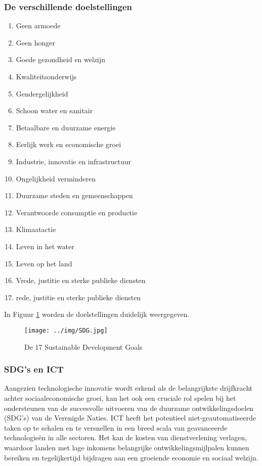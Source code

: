  \subsubsection{De verschillende doelstellingen}
 \begin{enumerate}
 	\item Geen armoede
 		\item Geen honger
 		\item Goede gezondheid en welzijn
 		\item Kwaliteitsonderwijs
 		\item Gendergelijkheid
 		\item Schoon water en sanitair
 		\item Betaalbare en duurzame energie
 		\item Eerlijk werk en economische groei
 		\item Industrie, innovatie en infrastructuur
 		\item Ongelijkheid verminderen
 		\item Duurzame steden en gemeenschappen
 		\item Verantwoorde consumptie en productie
 		\item Klimaatactie
 		\item Leven in het water
 		\item Leven op het land
 		\item Vrede, justitie en sterke publieke diensten
 		\item rede, justitie en sterke publieke diensten 
 \end{enumerate}
\autocite{VerenigdeNaties2004}

In Figuur \ref{SDGs} worden de doelstellingen duidelijk weergegeven.
 
 \begin{figure}[h!]
 	\texttt{[image: ../img/SDG.jpg]}
 	\caption{De 17 Sustainable Development Goals \autocite{VerenigdeNaties2004}}
 	\label{SDGs}
 \end{figure}

\subsubsection{SDG's en ICT}
Aangezien technologische innovatie wordt erkend als de belangrijkste drijfkracht achter sociaaleconomische groei, kan het ook een cruciale rol spelen bij het ondersteunen van de succesvolle uitvoeren van de duurzame ontwikkelingsdoelen (SDG's) van de  Verenigde Naties. ICT heeft het potentieel niet-geautomatiseerde taken op te schalen en te versnellen in een breed scala van geavanceerde technologieën in alle sectoren. Het kan de kosten van dienstverlening verlagen, waardoor landen met lage inkomens belangrijke ontwikkelingsmijlpalen kunnen bereiken en tegelijkertijd bijdragen aan een groeiende economie en sociaal welzijn. \autocite{Ameyed2018}

